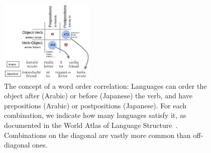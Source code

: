 \documentclass[9pt,twocolumn,twoside,lineno]{pnas-new}
\begin{document}
\begin{figure}
    \centering
    \includegraphics[width=0.4\textwidth]{figures/corr-full.png}
%
%
%
	\caption{ The concept of a word order correlation: Languages can order the object after (Arabic) or before (Japanese) the verb, and have prepositions (Arabic) or postpositions (Japanese). For each combination, we indicate how many languages satisfy it, as documented in the World Atlas of Language Structure~\cite{wals}. Combinations on the diagonal are vastly more common than off-diagonal ones. %
	}\label{fig:arabic-japanese-simple}	\label{fig:corr-table}
\end{figure}
\end{document}

